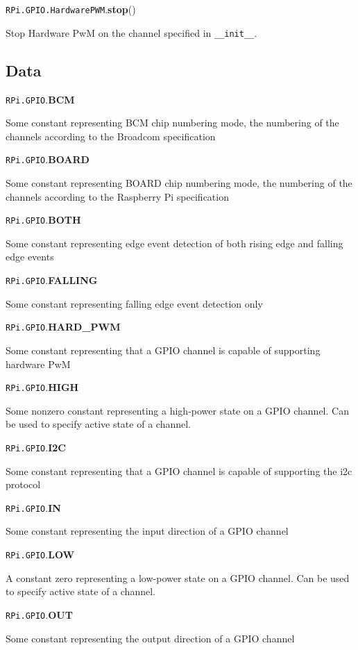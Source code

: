 \documentclass[12pt]{article}
\begin{document}
\noindent \texttt{RPi.GPIO.HardwarePWM}.\textbf{stop}()
        
Stop Hardware PwM on the channel specified in \texttt{\_\_init\_\_}.

\medskip \medskip


\subsection{Data}

\noindent \texttt{RPi.GPIO}.\textbf{BCM}

Some constant representing BCM chip numbering mode, the numbering of the channels according to the Broadcom specification

\noindent \texttt{RPi.GPIO}.\textbf{BOARD}

Some constant representing BOARD chip numbering mode, the numbering of the channels according to the Raspberry Pi specification

\noindent \texttt{RPi.GPIO}.\textbf{BOTH}

Some constant representing edge event detection of both rising edge and falling edge events

\noindent \texttt{RPi.GPIO}.\textbf{FALLING}

Some constant representing falling edge event detection only

\noindent \texttt{RPi.GPIO}.\textbf{HARD\_PWM}

Some constant representing that a GPIO channel is capable of supporting hardware PwM

\noindent \texttt{RPi.GPIO}.\textbf{HIGH}

Some nonzero constant representing a high-power state on a GPIO channel.
Can be used to specify active state of a channel.


\noindent \texttt{RPi.GPIO}.\textbf{I2C}

Some constant representing that a GPIO channel is capable of supporting the i2c protocol

\noindent \texttt{RPi.GPIO}.\textbf{IN}

Some constant representing the input direction of a GPIO channel

\noindent \texttt{RPi.GPIO}.\textbf{LOW}

A constant zero representing a low-power state on a GPIO channel.
Can be used to specify active state of a channel.

\noindent \texttt{RPi.GPIO}.\textbf{OUT}

Some constant representing the output direction of a GPIO channel
\end{document}

